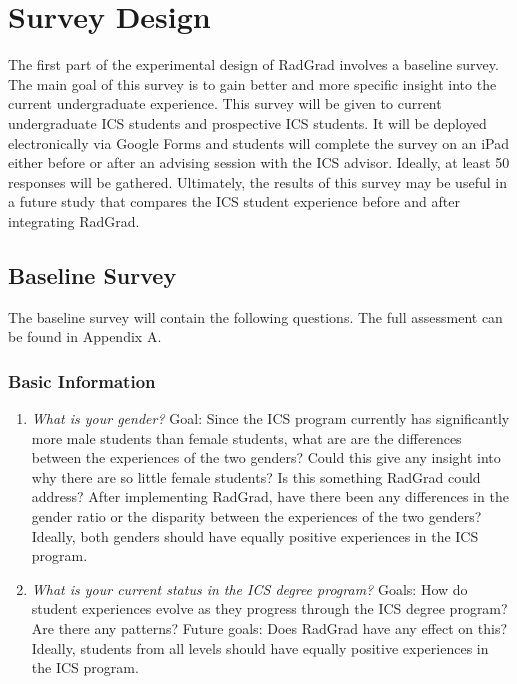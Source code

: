 \chapter{Survey Design}
\label{surveyDesign}
The first part of the experimental design of RadGrad involves a baseline survey. The main goal of this survey is to gain better and more specific insight into the current undergraduate experience. This survey will be given to current undergraduate ICS students and prospective ICS students. It will be deployed electronically via Google Forms and students will complete the survey on an iPad either before or after an advising session with the ICS advisor.  Ideally, at least 50 responses will be gathered. Ultimately, the results of this survey may be useful in a future study that compares the ICS student experience before and after integrating RadGrad. 
\section{Baseline Survey}
\label{baselineSurvey}
	The baseline survey will contain the following questions. The full assessment can be found in Appendix A. 

\subsection{Basic Information}
\begin{enumerate}
\item \textit{What is your gender? }
Goal: Since the ICS program currently has significantly more male students than female students, what are are the differences between the experiences of the two genders? Could this give any insight into why there are so little female students? Is this something RadGrad could address? After implementing RadGrad, have there been any differences in the gender ratio or the disparity between the experiences of the two genders? Ideally, both genders should have equally positive experiences in the ICS program.
\item \textit{What is your current status in the ICS degree program?}
Goals: How do student experiences evolve as they progress through the ICS degree program? Are there any patterns? Future goals: Does RadGrad have any effect on this? Ideally, students from all levels should have equally positive experiences in the ICS program. 
\end{enumerate}

